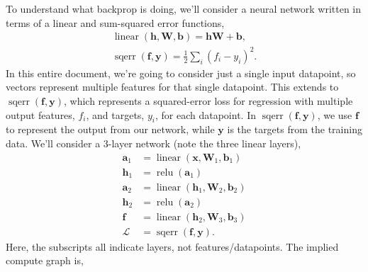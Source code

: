 \documentclass{article}
\newcommand{\bracket}[3]{\left#1 #3 \right#2}
\renewcommand{\b}{\bracket{(}{)}}
\newcommand{\x}{\mathbf{x}}
\newcommand{\y}{\mathbf{y}}
\newcommand{\f}{\mathbf{f}}
\newcommand{\h}{\mathbf{h}}
\newcommand{\bv}{\mathbf{b}}
\renewcommand{\a}{\mathbf{a}}
\newcommand{\W}{\mathbf{W}}
\renewcommand{\L}{\mathcal{L}}
\newcommand{\linear}{\operatorname{linear}}
\newcommand{\relu}{\operatorname{relu}}
\newcommand{\sqerr}{\operatorname{sqerr}}
\begin{document}
To understand what backprop is doing, we'll consider a neural network written in terms of a linear and sum-squared error functions,
\begin{subequations}
\begin{align}
  \label{eq:linear}
  \linear\b{\h, \W, \bv} = \h \W + \bv,\\
  \label{eq:sqerr}
  \sqerr\b{\f, \y} = \tfrac{1}{2} \sum_i (f_i - y_i)^2.
\end{align}
\end{subequations}
In this entire document, we're going to consider just a single input datapoint, so vectors represent multiple features for that single datapoint.
This extends to $\sqerr\b{\f, \y}$, which represents a squared-error loss for regression with multiple output features, $f_i$, and targets, $y_i$, for each datapoint.
In $\sqerr\b{\f, \y}$, we use $\f$ to represent the output from our network, while $\y$ is the targets from the training data.
We'll consider a 3-layer network (note the three linear layers),
\begin{subequations}
\label{eq:forward}
\begin{align}
  \a_1 &= \linear\b{\x, \W_1, \bv_1}\\
  \h_1 &= \relu\b{\a_1}\\
  \a_2 &= \linear\b{\h_1, \W_2, \bv_2}\\
  \h_2 &= \relu\b{\a_2}\\
  \f &= \linear\b{\h_2, \W_3, \bv_3}\\
  \label{eq:L}
  \L &= \sqerr\b{\f, \y}.
\end{align}
\end{subequations}
Here, the subscripts all indicate layers, not features/datapoints.
The implied compute graph is,
\end{document}
